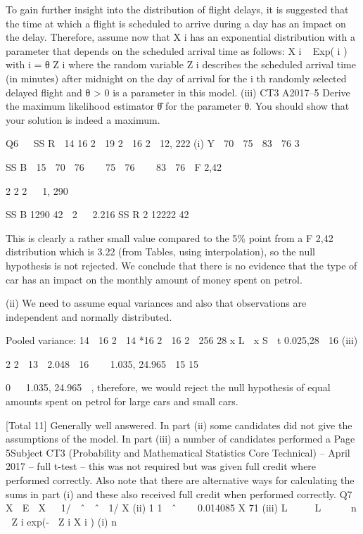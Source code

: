 \documentclass[a4paper,12pt]{article}
\begin{document}
\begin{enumerate}
To gain further insight into the distribution of flight delays, it is suggested that the
time at which a flight is scheduled to arrive during a day has an impact on the delay.
Therefore, assume now that X i has an exponential distribution with a parameter \lambda that
depends on the scheduled arrival time as follows:
X i ~ Exp( \lambda i ) with \lambda i = θ Z i
where the random variable Z i describes the scheduled arrival time (in minutes) after
midnight on the day of arrival for the i th randomly selected delayed flight and θ > 0 is
a parameter in this model.
(iii)
CT3 A2017–5
Derive the maximum likelihood estimator θ̂ for the parameter θ. You should
show that your solution is indeed a maximum.

Q6


SS R  14 16 2  19 2  16 2  12, 222
(i)
Y 
70  75  83
 76
3


SS B  15  70  76    75  76    83  76 
F 2,42

2
2
2
  1, 290

SS B
1290 42
 2 
 2.216
SS R
2 12222
42

This is clearly a rather small value compared to the 5\% point from a F 2,42
distribution which is 3.22 (from Tables, using interpolation), so the null
hypothesis is not rejected. We conclude that there is no evidence that the type
of car has an impact on the monthly amount of money spent on petrol.

(ii)
We need to assume equal variances and also that observations are independent
and normally distributed.

Pooled variance:
14  16 2  14 *16 2
 16 2  256
28
x L  x S  t 0.025,28  16
(iii)

2
2
 13  2.048  16 
  1.035, 24.965 
15
15

0   1.035, 24.965  , therefore, we would reject the null hypothesis of equal
amounts spent on petrol for large cars and small cars.

[Total 11]
Generally well answered. In part (ii) some candidates did not give the
assumptions of the model. In part (iii) a number of candidates performed a
Page 5Subject CT3 (Probability and Mathematical Statistics Core Technical) – April 2017 – %
full t-test – this was not required but was given full credit where performed
correctly. Also note that there are alternative ways for calculating the sums in
part (i) and these also received full credit when performed correctly.
Q7

X  E
 X   1/  ˆ 
 ˆ  1/ X 
(ii) 1
1
 ˆ    0.014085
X 71 
(iii) L     L     n  Z i exp(-  Z i X i )
(i)
n


\end{enumerate}
\end{document}
